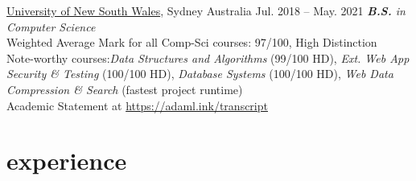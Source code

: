 \documentclass[hidelinks__VERSION__]{adamyi-cv}
\begin{document}
\begin{entrylist}


\entry
{\href{https://unsw.edu.au}{University of New South Wales}, Sydney Australia}
{Jul. 2018 -- May. 2021}
{\emph{\textbf{B.S.} in Computer Science}\\
Weighted Average Mark for all Comp-Sci courses: 97/100, High Distinction\\
Note-worthy courses:\emph{Data Structures and Algorithms} (99/100 HD), \emph{Ext. Web App Security \& Testing} (100/100 HD), \emph{Database Systems} (100/100 HD), \emph{Web Data Compression \& Search} (fastest project runtime)\\
Academic Statement at \href{https://adaml.ink/transcript}{https://adaml.ink/transcript}
}

\end{entrylist}


\section{experience}
\end{document}
